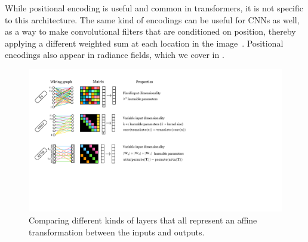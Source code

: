 While positional encoding is useful and common in transformers, it is not specific to this architecture. The same kind of encodings can be useful for CNNs as well, as a way to make convolutional filters that are conditioned on position, thereby applying a different weighted sum at each location in the image~\cite{liu2018intriguing}. Positional encodings also appear in radiance fields, which we cover in \chap{\ref{chapter:nerfs}}. %






\begin{figure}[t]
    \centerline{
        \includegraphics[width=1.0\linewidth]{figures/transformers/affine_layer_comparison.pdf}
    }
    \caption{Comparing different kinds of layers that all represent an affine transformation between the inputs and outputs.}
    \label{fig:transformers:affine_layer_comparison}
\end{figure}

